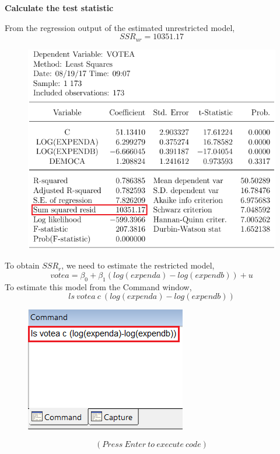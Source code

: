 \documentclass[12pt]{report}
\begin{document}
\noindent \textbf{Calculate the test statistic}

\noindent From the regression output of the estimated unrestricted model,
$$SSR_{ur} = 10351.17$$
\begin{figure}[H]
	\centering
	\includegraphics{q1_15}
\end{figure}
\vspace{-\baselineskip}
\noindent To obtain $SSR_r$, we need to estimate the restricted model,
$$votea = \beta_0 + \beta_1(log(expenda) - log(expendb)) + u $$
\noindent To estimate this model from the Command window,
$$ls\ votea\ c\ (log(expenda)-log(expendb))$$
\begin{figure}[H]
	\centering
	\includegraphics{q1_16}
\end{figure}
\vspace{-\baselineskip}
$$(Press\ Enter\ to\ execute\ code)$$
\end{document}
